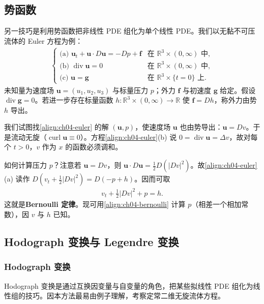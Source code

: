 \documentclass[../../main.tex]{subfiles}
\begin{document}
\subsection{势函数}\label{subsection:ch04-potential}

另一技巧是利用势函数把非线性 PDE 组化为单个线性 PDE。我们以无黏不可压流体的 Euler 方程为例：
\begin{align}\label{align:ch04-euler}
\begin{cases}
\text{(a) } \mathbf{u}_t+\mathbf{u}\cdot D\mathbf{u}=-Dp+\mathbf{f} & \text{在 }\mathbb{R}^3\times(0,\infty)\text{ 中},\\
\text{(b) } \operatorname{div}\mathbf{u}=0 & \text{在 }\mathbb{R}^3\times(0,\infty)\text{ 中},\\
\text{(c) } \mathbf{u}=\mathbf{g} & \text{在 }\mathbb{R}^3\times\{t=0\}\text{ 上}.
\end{cases}
\end{align}
未知量为速度场 $\mathbf{u}=(u_1,u_2,u_3)$ 与标量压力 $p$；外力 $\mathbf{f}$ 与初速度 $\mathbf{g}$ 给定。假设 $\operatorname{div}\mathbf{g}=0$。若进一步存在标量函数 $h:\mathbb{R}^3\times(0,\infty)\to\mathbb{R}$ 使 $\mathbf{f}=Dh$，称外力由势 $h$ 导出。

我们试图找\eqref{align:ch04-euler} 的解 $(\mathbf{u},p)$，使速度场 $\mathbf{u}$ 也由势导出：$\mathbf{u}=Dv$。于是流动无旋（$\operatorname{curl}\mathbf{u}\equiv 0$）。方程\eqref{align:ch04-euler}(b) 说 $0=\operatorname{div}\mathbf{u}=\Delta v$，故对每个 $t>0$，$v$ 作为 $x$ 的函数必须调和。

如何计算压力 $p$？注意若 $\mathbf{u}=Dv$，则 $\mathbf{u}\cdot D\mathbf{u}=\tfrac{1}{2}D(|Dv|^2)$。故\eqref{align:ch04-euler}(a) 读作 $D(v_t+\tfrac{1}{2}|Dv|^2)=D(-p+h)$。因而可取
\begin{align}\label{align:ch04-bernoulli}
v_t+\frac{1}{2}|Dv|^2+p=h.
\end{align}
这就是\textbf{Bernoulli 定律}。现可用\eqref{align:ch04-bernoulli} 计算 $p$（相差一个相加常数），因 $v$ 与 $h$ 已知。

\subsection{Hodograph 变换与 Legendre 变换}\label{subsection:ch04-hodograph}

\subsubsection{Hodograph 变换}

Hodograph 变换是通过互换因变量与自变量的角色，把某些拟线性 PDE 组化为线性组的技巧。因本方法最易由例子理解，考察定常二维无旋流体方程。
\end{document}
